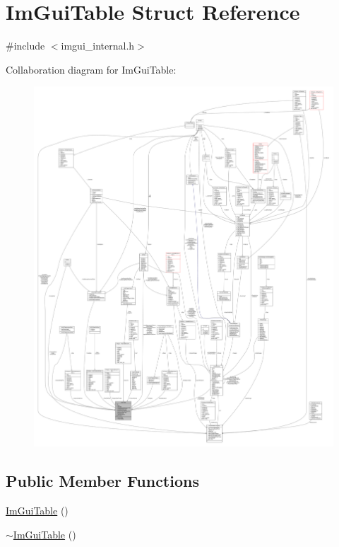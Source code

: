 \hypertarget{structImGuiTable}{}\section{Im\+Gui\+Table Struct Reference}
\label{structImGuiTable}


{\ttfamily \#include $<$imgui\+\_\+internal.\+h$>$}



Collaboration diagram for Im\+Gui\+Table\+:
\nopagebreak
\begin{figure}[H]
\begin{center}
\leavevmode
\includegraphics[width=350pt]{structImGuiTable__coll__graph}
\end{center}
\end{figure}
\subsection*{Public Member Functions}
\begin{DoxyCompactItemize}
\item 
\hyperlink{structImGuiTable_ad9cfd8be1defebf32b2b2d7fcd5fd152}{Im\+Gui\+Table} ()
\item 
\hyperlink{structImGuiTable_ac9e489ed577c125c930364a4c903132c}{$\sim$\+Im\+Gui\+Table} ()
\end{DoxyCompactItemize}
